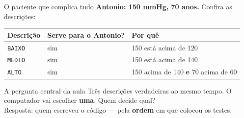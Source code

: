 \documentclass[aspectratio=169]{beamer}
\newcommand{\code}[1]{\texttt{\small #1}}
\begin{document}
\begin{frame}{O paciente que complica tudo}
  \textbf{Antonio: 150 mmHg, 70 anos.} Confira as descrições:

  \vspace{0.25cm}
  \begin{center}
  \small
  \begin{tabular}{@{}lll@{}}
    \toprule
    \textbf{Descrição} & \textbf{Serve para o Antonio?} & \textbf{Por quê} \\
    \midrule
    \code{BAIXO}   & sim & 150 está acima de 120 \\
    \code{MEDIO}   & sim & 150 está acima de 140 \\
    \code{ALTO}    & sim & 150 acima de 140 \textbf{e} 70 acima de 60 \\
    \bottomrule
  \end{tabular}
  \end{center}

  \vspace{0.25cm}
  \begin{alertblock}{A pergunta central da aula}
    Três descrições verdadeiras ao mesmo tempo. O computador vai
    escolher \textbf{uma}. Quem decide qual? \\
    Resposta: quem escreveu o código --- pela \textbf{ordem} em que
    colocou os testes.
  \end{alertblock}
\end{frame}
\end{document}
